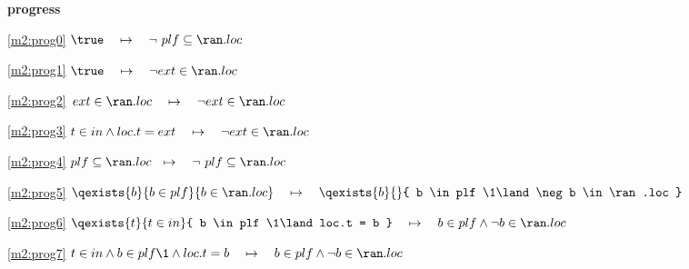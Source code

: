 \textbf{progress}
\begin{block}
\item[ \eqref{m2:prog0} ]$\true \quad \mapsto\quad \neg ~ plf \subseteq \ran.loc $ %
\item[ \eqref{m2:prog1} ]$\true \quad \mapsto\quad \neg ext \in \ran. loc $ %
\item[ \eqref{m2:prog2} ]$\, ext \in \ran.loc   \quad \mapsto\quad \neg ext \in \ran. loc $ %
\item[ \eqref{m2:prog3} ]$t \in in \land loc.t = ext  \quad \mapsto\quad \neg ext \in \ran. loc $ %
\item[ \eqref{m2:prog4} ]$plf \subseteq \ran.loc \!\! \quad \mapsto\quad \neg ~ plf \subseteq \ran.loc $ %
\item[ \eqref{m2:prog5} ]$\qexists{b}{b \in plf}{ b \in \ran.loc } \quad \mapsto\quad \qexists{b}{}{ b \in plf \1\land \neg b \in \ran.loc } $ %
\item[ \eqref{m2:prog6} ]$\qexists{t}{t \in in}{ b \in plf \1\land  loc.t = b }  \quad \mapsto\quad b \in plf \land \neg b \in \ran.loc $ %
\item[ \eqref{m2:prog7} ]$t \in in \land b \in plf \1\land  loc.t = b  \quad \mapsto\quad b \in plf \land \neg b \in \ran.loc $ %
\end{block}
